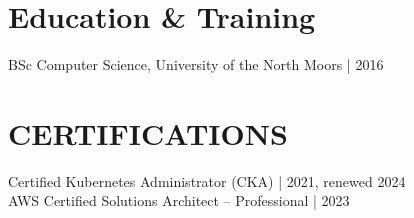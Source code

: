 \documentclass[11pt,a4paper]{article}
\begin{document}
\section*{Education \& Training}
BSc Computer Science, University of the North Moors | 2016

\section*{CERTIFICATIONS}
Certified Kubernetes Administrator (CKA) | 2021, renewed 2024\\
AWS Certified Solutions Architect -- Professional | 2023
\end{document}
